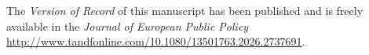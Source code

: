 The \emph{Version of Record} of this manuscript has been published and is freely available in the \emph{Journal of European Public Policy}%
\url{http://www.tandfonline.com/10.1080/13501763.2026.2737691}.